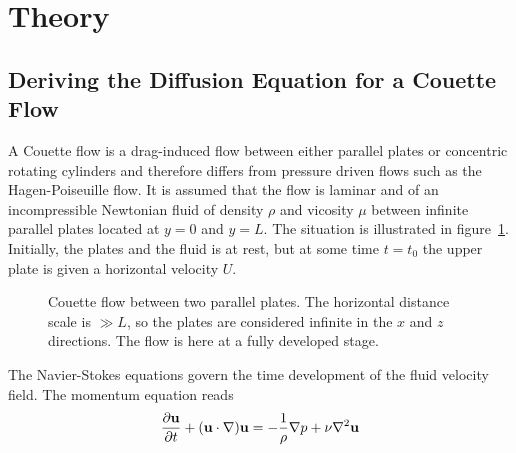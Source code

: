 \documentclass[aps,reprint]{revtex4-1}
\def\axislength{.5}
\begin{document}
\section{Theory} \label{sec:theory}
\subsection{Deriving the Diffusion Equation for a Couette Flow}
A Couette flow is a drag-induced flow between either parallel plates or concentric
rotating cylinders and therefore differs from pressure driven flows such as the
Hagen-Poiseuille flow. It is assumed that the flow is laminar and of an incompressible
Newtonian fluid of density $\rho$ and vicosity $\mu$ between infinite parallel
plates located at $y = 0$ and $y = L$. The situation is illustrated in figure~\ref{fig:couette}.
Initially, the plates and the fluid is at rest, but at some time $t = t_0$
the upper plate is given a horizontal velocity $U$.
\begin{figure}[H]
  \centering
  \caption{Couette flow between two parallel plates. The horizontal distance
  scale is $\gg L$, so the plates are considered infinite in the $x$ and $z$
  directions. The flow is here at a fully developed stage.}
  \label{fig:couette}
\end{figure}
The Navier-Stokes equations govern the time development of the fluid velocity field.
The momentum equation reads
\begin{align*}
  \pdv{\vb{u}}{t} + (\vb{u} \cdot \nabla) \vb{u} = - \frac{1}{\rho} \nabla p + \nu \nabla^2 \vb{u}
\end{align*}
\end{document}
